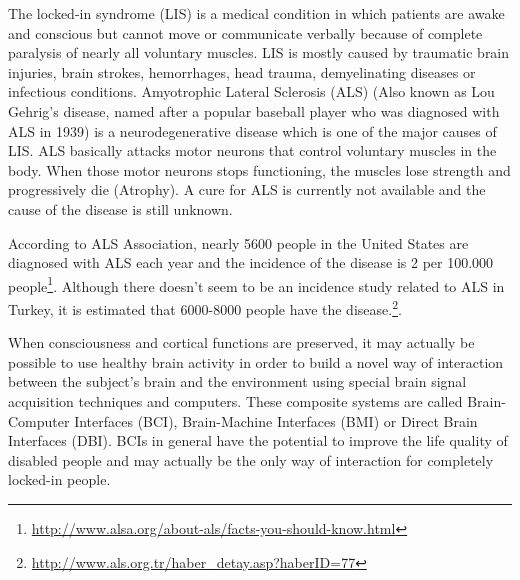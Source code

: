\documentclass[12pt]{article}
\numberwithin{equation}{section}
\numberwithin{figure}{section}
\numberwithin{table}{section}
\begin{document}
\par{
    The locked-in syndrome (LIS) is a medical condition in which patients are awake and conscious but
    cannot move or communicate verbally because of complete paralysis of nearly all voluntary muscles.
    LIS is mostly caused by traumatic brain injuries, brain strokes, hemorrhages, head trauma, demyelinating diseases
    or infectious conditions. Amyotrophic Lateral Sclerosis (ALS) (Also known as Lou Gehrig's disease,
    named after a popular baseball player who was diagnosed with ALS in 1939) is a neurodegenerative disease
    which is one of the major causes of LIS. ALS basically attacks motor neurons that control voluntary muscles in the body.
    When those motor neurons stops functioning, the muscles lose strength and progressively die (Atrophy).
    A cure for ALS is currently not available and the cause of the disease is still unknown.
}

\par {
    According to ALS Association, nearly 5600 people in the United States are
    diagnosed with ALS each year and the incidence of the disease is 2 per 100.000
    people\footnote{\url{http://www.alsa.org/about-als/facts-you-should-know.html}}. Although
    there doesn't seem to be an incidence study related to ALS in Turkey, it is estimated that
    6000-8000 people have the disease.\footnote{\url{http://www.als.org.tr/haber_detay.asp?haberID=77}}.
}

\par{
    When consciousness and cortical functions are preserved, it may actually be
    possible to use healthy brain activity in order to build a novel way of interaction
    between the subject's brain and the environment using special brain signal
    acquisition techniques and computers. These composite systems are called
    Brain-Computer Interfaces (BCI), Brain-Machine Interfaces (BMI) or Direct Brain Interfaces (DBI).
    BCIs in general have the potential to improve the life quality of disabled people and may actually
    be the only way of interaction for completely locked-in people.
}
\end{document}

